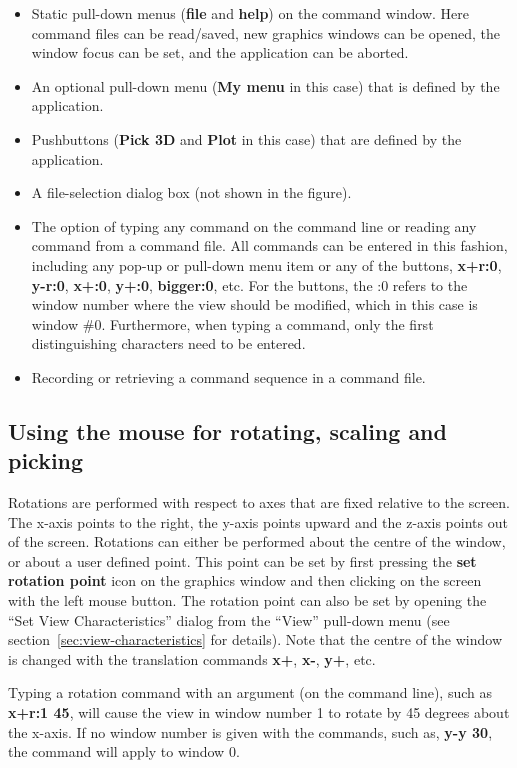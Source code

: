 \begin{itemize}
%
  \item Static pull-down menus ({\bf file} and {\bf help}) on the
     command window. Here command files can be read/saved, new
     graphics windows can be opened, the window focus can be set, and
     the application can be aborted.
%
  \item An optional pull-down menu ({\bf My menu} in this case) that is
     defined by the application.
%
  \item Pushbuttons ({\bf Pick 3D} and {\bf Plot} in this case) that are defined by the application.
%
  \item A file-selection dialog box (not shown in the figure).
%
  \item The option of typing any command on the command line or reading
  any command from a command file. All commands can be entered in this
  fashion, including any pop-up or pull-down menu item or any of the
  buttons, {\bf x+r:0}, {\bf y-r:0}, {\bf x+:0}, {\bf y+:0}, {\bf
  bigger:0}, etc. For the buttons, the :0 refers to the window number
  where the view should be modified, which in this case is window
  \#0. Furthermore, when typing a command, only the first
  distinguishing characters need to be entered.
%
  \item Recording or retrieving a command sequence in a command file.
\end{itemize}



\subsection{Using the mouse for rotating, scaling and picking}

Rotations are performed with respect to axes that are fixed relative
to the screen. The x-axis points to the right, the y-axis points
upward and the z-axis points out of the screen.  Rotations can either
be performed about the centre of the window, or about a user defined
point. This point can be set by first pressing the {\bf set
rotation point} icon on the graphics window and then clicking on the
screen with the left mouse button. The rotation point can also be set
by opening the ``Set View Characteristics'' dialog from the ``View''
pull-down menu (see section~\protect\ref{sec:view-characteristics} for
details). Note that the centre of the window is changed with the
translation commands {\bf x+}, {\bf x-}, {\bf y+}, etc.

Typing a rotation command with an argument (on the command line), 
such as {\bf x+r:1 45}, will cause the view in window number 1 to 
rotate by 45 degrees about the x-axis. If no window number is given
with the commands, such as, {\bf y-y 30}, the command will apply to
window 0.

